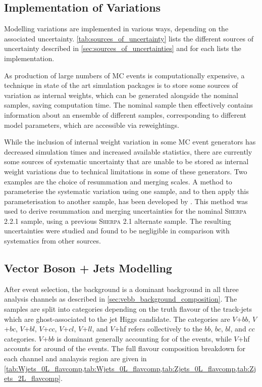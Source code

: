 \subsection{Implementation of Variations}\label{sec:implementation_of_variations}

Modelling variations are implemented in various ways, depending on the associated uncertainty.
\cref{tab:sources_of_uncertainty} lists the different sources of uncertainty described in \cref{sec:sources_of_uncertainties} and for each lists the implementation.



As production of large numbers of MC events is computationally expensive, a technique in state of the art simulation packages is to store some sources of variation as internal weights, which can be generated alongside the nominal samples, saving computation time.
The nominal sample then effectively contains information about an ensemble of different samples, corresponding to different model parameters, which are accessible via reweightings. 

While the inclusion of internal weight variation in some MC event generators has decreased simulation times and increased available statistics, there are currently some sources of systematic uncertainty that are unable to be stored as internal weight variations due to technical limitations in some of these generators.
Two examples are the choice of resummation and merging scales.
A method to parameterise the systematic variation using one sample, and to then apply this parameterisation to another sample, has been developed by \ATLAS \cite{Anders:2125718}.
This method was used to derive resummation and merging uncertainties for the nominal \textsc{Sherpa 2.2.1} sample, using a previous \textsc{Sherpa 2.1} alternate sample.
The resulting uncertainties were studied and found to be negligible in comparison with systematics from other sources.



\subsection{Vector Boson + Jets Modelling}\label{sec:vjets_modelling}

After event selection, the \Vjets background is a dominant background in all three analysis channels as described in \cref{sec:vebb_background_composition}.
The \Vjets samples are split into categories depending on the truth flavour of the track-jets which are ghost-associated to the \largeR jet Higgs candidate.
The categories are $V$+$bb$, $V$+$bc$, $V$+$bl$, $V$+$cc$, $V$+$cl$, $V$+$ll$, and $V$+hf refers collectively to the $bb$, $bc$, $bl$, and $cc$ categories.
$V$+$bb$ is dominant generally accounting for  of the events, while $V$+hf accounts for around  of the events.
The full flavour composition breakdown for each channel and analaysis region are given in \cref{tab:Wjets_0L_flavcomp,tab:Wjets_0L_flavcomp,tab:Zjets_0L_flavcomp,tab:Zjets_2L_flavcomp}.

